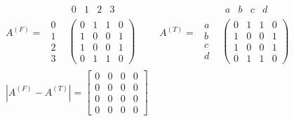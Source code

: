 \begin{align*}
A^{(F)} = 
\begin{array}{cc} &
\begin{array}{cccc} 0 & 1 & 2 & 3 \end{array}
\\
\begin{array}{cccc}
0 \\
1 \\
2 \\
3 \end{array}
&
\left(
\begin{array}{cccc}
0 & 1 & 1 & 0\\
1 & 0 & 0 & 1\\
1 & 0 & 0 & 1\\
0 & 1 & 1 & 0\end{array}
\right)\end{array}
\quad \quad
A^{(T)} = 
\begin{array}{cc} &
\begin{array}{cccc} a & b & c & d \end{array}
\\
\begin{array}{ccc}
a \\
b \\
c \\
d \end{array}
&
\left(
\begin{array}{cccc}
0 & 1 & 1 & 0\\
1 & 0 & 0 & 1\\
1 & 0 & 0 & 1\\
0 & 1 & 1 & 0\end{array}
\right)\end{array} \\
\left|A^{(F)} - A^{(T)}\right| = \left[
\begin{array}{cccc}
0 & 0 & 0 & 0\\
0 & 0 & 0 & 0\\
0 & 0 & 0 & 0\\
0 & 0 & 0 & 0\end{array}
\right]
\end{align*}

